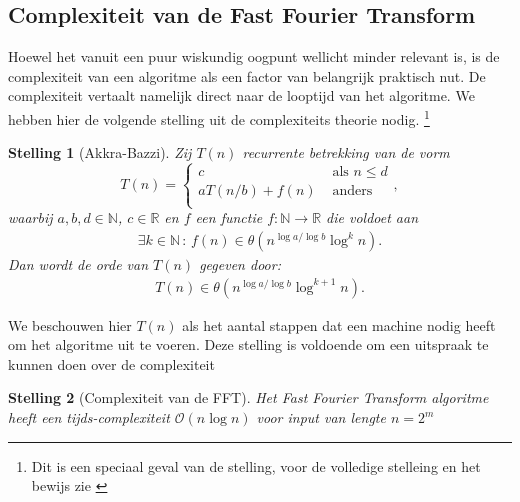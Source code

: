 \documentclass[11pt]{report}
\newcommand{\R}{\mathbb{R}}
\newcommand{\N}{\mathbb{N}}
\renewcommand{\O}{\mathcal{O}}
\newtheorem*{stelling}{Stelling}
\theoremstyle{remark}
\newcommand{\eq}[1]{\begin{eqnarray*} #1 \end{eqnarray*}}
\begin{document}
\subsection{Complexiteit van de Fast Fourier Transform}
Hoewel het vanuit een puur wiskundig oogpunt wellicht minder relevant is, is de complexiteit van een algoritme 
als een factor van belangrijk praktisch nut. De complexiteit vertaalt namelijk direct naar 
de looptijd van het algoritme. We hebben hier de volgende stelling uit de complexiteits theorie nodig. 
\footnote{Dit is een speciaal geval van de stelling, voor de volledige stelleing en het bewijs zie \cite{akra-bazzi}}

\begin{stelling}[Akkra-Bazzi]
    Zij $T(n)$ recurrente betrekking van de vorm
    \[
    T(n) = \begin{cases}
      c &\text{ als } n \leq d \\
      a T(n/b) + f(n) &\text{ anders} \\
    \end{cases},
    \]
    waarbij $a,b,d\in\N$, $c\in\R$ en $f$ een functie $f:\N\rightarrow\R$ die voldoet aan 
    \eq{
  \exists k \in \N \,:\, f(n) \in \theta(n^{\log a/\log b} \log^k n).
    }
    Dan wordt de orde van $T(n)$ gegeven door:
    \eq{
      T(n) \in \theta(n^{\log a / \log b} \log^{k+1}n).
    }
\end{stelling}
We beschouwen hier $T(n)$ als het aantal stappen dat een machine nodig heeft om het algoritme uit te voeren.
Deze stelling is voldoende om een uitspraak te kunnen doen over de complexiteit 
\begin{stelling}[Complexiteit van de FFT]
  Het Fast Fourier Transform algoritme heeft een tijds-complexiteit $\O(n\log n)$ voor input van lengte $n=2^m$ 
\end{stelling} 
\end{document}
